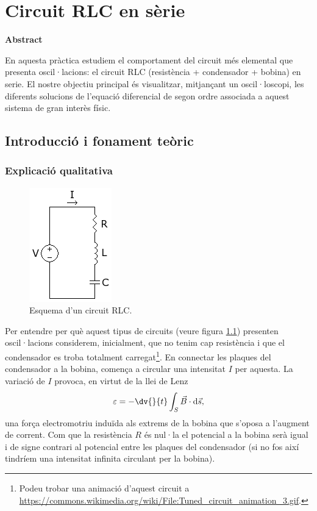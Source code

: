 \documentclass[a4paper,10.5pt]{report}
\newenvironment{chapterabstract}{
	\begin{center}
		\bfseries Abstract
	\end{center}
	\quotation
}{\endquotation}
\begin{document}
\chapter{Circuit RLC en sèrie}

\begin{chapterabstract}
	En aquesta pràctica estudiem el comportament del circuit més elemental que presenta oscil·lacions: el circuit RLC (resistència + condensador + bobina) en serie. El nostre objectiu principal és visualitzar, mitjançant un oscil·loscopi, les diferents solucions de l'equació diferencial de segon ordre associada a aquest sistema de gran interès físic.
\end{chapterabstract}

\section{Introducció i fonament teòric}

\subsection{Explicació qualitativa}

\begin{figure}[h]
	\centering
	\includegraphics[width=0.15\linewidth]{screenshot014}
	\caption{Esquema d'un circuit RLC.}
	\label{fig:3.1}
\end{figure}

Per entendre per què aquest tipus de circuits (veure figura \ref{fig:3.1}) presenten oscil·lacions considerem, inicialment, que no tenim cap resistència i que el condensador es troba totalment carregat\footnote{Podeu trobar una animació d'aquest circuit a \url{https://commons.wikimedia.org/wiki/File:Tuned_circuit_animation_3.gif}.}. En connectar les plaques del condensador a la bobina, comença a circular una intensitat $I$ per aquesta. La variació de $I$ provoca, en virtut de la llei de Lenz
\begin{equation}
	\varepsilon = - \dv{}{t}\int_S \vec{B} \cdot \mathrm{d}\vec{s} \label{eq:3.1},
\end{equation}
una força electromotriu induïda als extrems de la bobina que s'oposa a l'augment de corrent. Com que la resistència $R$ és nul·la el potencial a la bobina serà igual i de signe contrari al potencial entre les plaques del condensador (si no fos així tindríem una intensitat infinita circulant per la bobina). 
\end{document}
